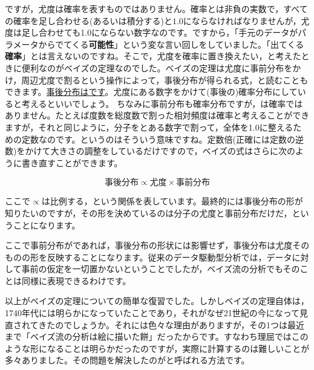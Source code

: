 \documentclass{ltjsbook}
\begin{document}
ですが，尤度は確率を表すものではありません。確率とは非負の実数で，すべての確率を足し合わせる(あるいは積分する)と$1.0$にならなければなりませんが，尤度は足し合わせても1.0にならない数字なのです。ですから，「手元のデータがパラメータからでてくる\textbf{可能性}」という変な言い回しをしていました。「出てくる\textbf{確率}」とは言えないのですね。そこで，尤度を確率に置き換えたい，と考えたときに便利なのがベイズの定理なのでした。ベイズの定理は尤度に事前分布をかけ，周辺尤度で割るという操作によって，事後分布が得られる式，と読むこともできます。\underline{事後分布はです}。尤度にある数字をかけて(事後の)確率分布にしていると考えるといいでしょう。
ちなみに事前分布も確率分布ですが，は確率ではありません。たとえば度数を総度数で割った相対頻度は確率と考えることができますが，それと同じように，分子をとある数字で割って，全体を1.0に整えるための定数なのです。というのはそういう意味ですね。定数倍(正確には定数の逆数)をかけて大きさの調整をしているだけですので，ベイズの式はさらに次のように書き直すことができます。

$$ \mbox{事後分布} \propto \mbox{尤度}\times \mbox{事前分布} $$

ここで$\propto$は比例する，という関係を表しています。最終的には事後分布の形が知りたいのですが，その形を決めているのは分子の尤度と事前分布だけだ，ということになります。

ここで事前分布がであれば，事後分布の形状には影響せず，事後分布は尤度そのものの形を反映することになります。従来のデータ駆動型分析では，データに対して事前の仮定を一切置かないということでしたが，ベイズ流の分析でもそのことは同様に表現できるわけです。

以上がベイズの定理についての簡単な復習でした。しかしベイズの定理自体は，1740年代には明らかになっていたことであり，それがなぜ21世紀の今になって見直されてきたのでしょうか。それには色々な理由がありますが，その1つは最近まで「ベイズ流の分析は絵に描いた餅」だったからです。すなわち理屈ではこのような形になることは明らかだったのですが，実際に計算するのは難しいことが多々ありました。その問題を解決したのがと呼ばれる方法です。
\end{document}
